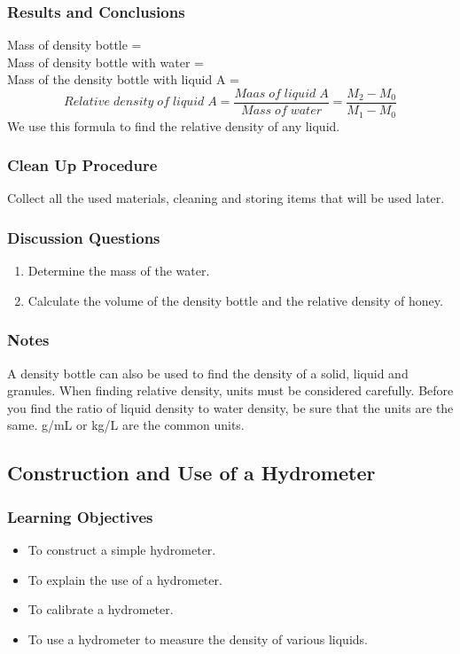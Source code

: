 \subsubsection*{Results and Conclusions}
Mass of density bottle = \\
Mass of density bottle with water = \\
Mass of the density bottle with liquid A = \\
$$Relative \;density \;of \;liquid \;A = \frac{Maas\; of\;liquid\;A}{Mass\; of\; water}=\frac{M_2-M_0}{M_1-M_0}$$
We use this formula to find the relative density of any liquid.

\subsubsection*{Clean Up Procedure}
Collect all the used materials, cleaning and storing items that will be used later.

\subsubsection*{Discussion Questions}
\begin{enumerate}
\item{Determine the mass of the water.} 
\item{Calculate the volume of the density bottle and the relative density of honey.} 
\end{enumerate}

\subsubsection*{Notes}
A density bottle can also be used to find the density of a solid, liquid and granules.
When finding relative density, units must be considered carefully.  Before you find the ratio of liquid density to water density, be sure that the units are the same.  g/mL or kg/L are the common units.

\subsection{Construction and Use of a Hydrometer}

\subsubsection*{Learning Objectives}
\begin{itemize}
\item{To construct a simple hydrometer.} 
\item{To explain the use of a hydrometer.} 
\item{To calibrate a hydrometer.} 
\item{To use a hydrometer to measure the density of various liquids.} 
\end{itemize}

